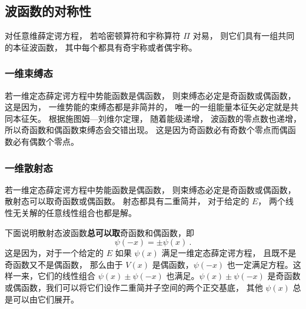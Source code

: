 \subsection{波函数的对称性}\label{sub_SchEq_1}
对任意维薛定谔方程， 若哈密顿算符和宇称算符 $\Pi$ 对易， 则它们具有一组共同的本征波函数， 其中每个都具有奇宇称或者偶宇称。

\subsubsection{一维束缚态}
若一维定态薛定谔方程中势能函数是偶函数， 则束缚态必定是奇函数或偶函数， 这是因为， 一维势能的束缚态都是非简并的， 唯一的一组能量本征矢必定就是共同本征矢。 根据施图姆—刘维尔定理， 随着能级递增， 波函数的零点数也递增， 所以奇函数和偶函数束缚态会交错出现。 这是因为奇函数必有奇数个零点而偶函数必有偶数个零点。

\subsubsection{一维散射态}
若一维定态薛定谔方程中势能函数是偶函数， 则束缚态必定是奇函数或偶函数， 散射态可以取奇函数或偶函数。 射态都具有二重简并， 对于给定的 $E$， 两个线性无关解的任意线性组合也都是解。

下面说明散射态波函数\textbf{总可以取}奇函数和偶函数，即
\begin{equation}\label{eq_SchEq_3}
\psi(-x) = \pm \psi(x)~.
\end{equation}
这是因为，对于一个给定的 $E$ 如果 $\psi(x)$ 满足一维定态薛定谔方程， 且既不是奇函数又不是偶函数， 那么由于 $V(x)$ 是偶函数，$\psi(-x)$ 也一定满足方程。这样一来，它们的线性组合 $\psi(x)\pm\psi(-x)$ 也满足。$\psi(x)\pm \psi(-x)$ 是奇函数或偶函数，我们可以将它们设作二重简并子空间的两个正交基底， 其他 $\psi(x)$ 总是可以由它们展开。
